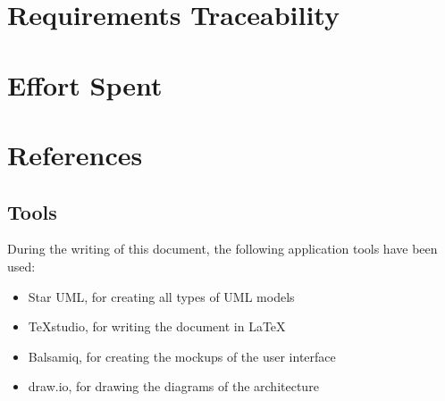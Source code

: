 \documentclass[11pt,a4paper]{report}
\begin{document}
\chapter{Requirements Traceability}
\chapter{Effort Spent}
\chapter{References}
\section{Tools}
During the writing of this document, the following application tools have been used:
\begin{itemize}
	\item Star UML, for creating all types of UML models
	\item TeXstudio, for writing the document in \LaTeX
	\item Balsamiq, for creating the mockups of the user interface
	\item draw.io, for drawing the diagrams of the architecture
\end{itemize}
\end{document}
